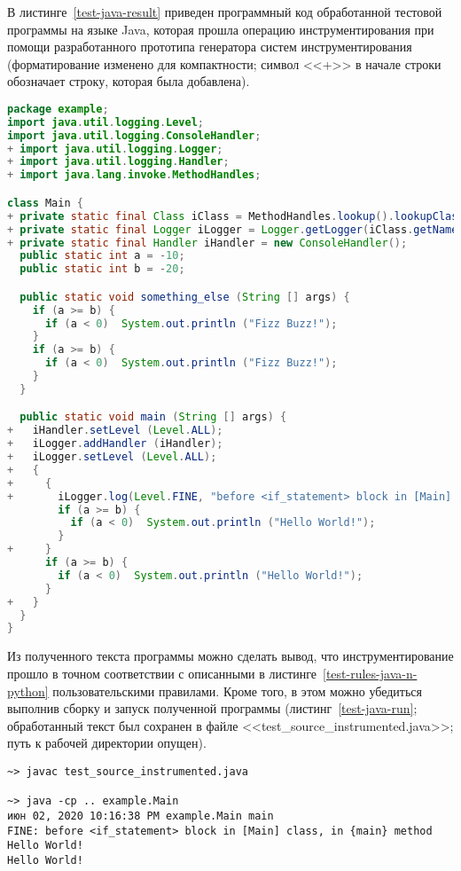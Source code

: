 В листинге~\ref{test-java-result} приведен программный код обработанной тестовой программы на языке Java, которая прошла операцию инструментирования при помощи разработанного прототипа генератора систем инструментирования (форматирование изменено для компактности; символ <<+>> в начале строки обозначает строку, которая была добавлена).

\begin{lstlisting}[frame=single, language=Java, label={test-java-result}, caption={Текст инструментированного тестового приложения.}]
package example;
import java.util.logging.Level;
import java.util.logging.ConsoleHandler;
+ import java.util.logging.Logger;
+ import java.util.logging.Handler;
+ import java.lang.invoke.MethodHandles;

class Main {
+ private static final Class iClass = MethodHandles.lookup().lookupClass();
+ private static final Logger iLogger = Logger.getLogger(iClass.getName());
+ private static final Handler iHandler = new ConsoleHandler();
  public static int a = -10;
  public static int b = -20;

  public static void something_else (String [] args) {
    if (a >= b) {
      if (a < 0)  System.out.println ("Fizz Buzz!");
    }
    if (a >= b) {
      if (a < 0)  System.out.println ("Fizz Buzz!");
    }
  }

  public static void main (String [] args) {
+   iHandler.setLevel (Level.ALL);
+   iLogger.addHandler (iHandler);
+   iLogger.setLevel (Level.ALL);
+   {
+     {
+       iLogger.log(Level.FINE, "before <if_statement> block in [Main] class, in {main} method");
        if (a >= b) {
          if (a < 0)  System.out.println ("Hello World!");
        }
+     }
      if (a >= b) {
        if (a < 0)  System.out.println ("Hello World!");
      }
+   }
  }
}
\end{lstlisting}

Из полученного текста программы можно сделать вывод, что инструментирование прошло в точном соответствии с описанными в листинге~\ref{test-rules-java-n-python} пользовательскими правилами.
Кроме того, в этом можно убедиться выполнив сборку и запуск полученной программы (листинг~\ref{test-java-run}; обработанный текст был сохранен в файле <<test\_source\_instrumented.java>>; путь к рабочей директории опущен).

\begin{lstlisting}[frame=single, label={test-java-run}, caption={Результаты сборки и запуска обработанного тестового приложения.}]
~> javac test_source_instrumented.java

~> java -cp .. example.Main
июн 02, 2020 10:16:38 PM example.Main main
FINE: before <if_statement> block in [Main] class, in {main} method
Hello World!
Hello World!
\end{lstlisting}

